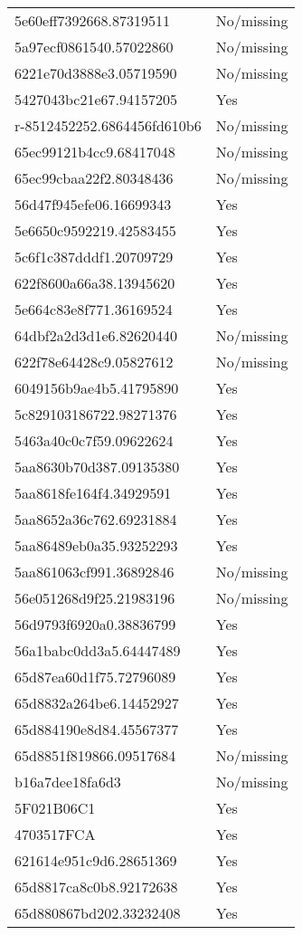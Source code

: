 \begin{tabular}{ll}
5e60eff7392668.87319511 & No/missing \\
5a97ecf0861540.57022860 & No/missing \\
6221e70d3888e3.05719590 & No/missing \\
5427043bc21e67.94157205 & Yes \\
r-8512452252.6864456fd610b6 & No/missing \\
65ec99121b4cc9.68417048 & No/missing \\
65ec99cbaa22f2.80348436 & No/missing \\
56d47f945efe06.16699343 & Yes \\
5e6650c9592219.42583455 & Yes \\
5c6f1c387dddf1.20709729 & Yes \\
622f8600a66a38.13945620 & Yes \\
5e664c83e8f771.36169524 & Yes \\
64dbf2a2d3d1e6.82620440 & No/missing \\
622f78e64428c9.05827612 & No/missing \\
6049156b9ae4b5.41795890 & Yes \\
5c829103186722.98271376 & Yes \\
5463a40c0c7f59.09622624 & Yes \\
5aa8630b70d387.09135380 & Yes \\
5aa8618fe164f4.34929591 & Yes \\
5aa8652a36c762.69231884 & Yes \\
5aa86489eb0a35.93252293 & Yes \\
5aa861063cf991.36892846 & No/missing \\
56e051268d9f25.21983196 & No/missing \\
56d9793f6920a0.38836799 & Yes \\
56a1babc0dd3a5.64447489 & Yes \\
65d87ea60d1f75.72796089 & Yes \\
65d8832a264be6.14452927 & Yes \\
65d884190e8d84.45567377 & Yes \\
65d8851f819866.09517684 & No/missing \\
b16a7dee18fa6d3 & No/missing \\
5F021B06C1 & Yes \\
4703517FCA & Yes \\
621614e951c9d6.28651369 & Yes \\
65d8817ca8c0b8.92172638 & Yes \\
65d880867bd202.33232408 & Yes \\

\end{tabular}
